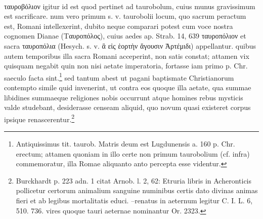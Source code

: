 \documentclass[a4paper, 11pt, oneside, polutonikogreek, german]{article}
\begin{document}
\paragraph{}
ταυροβόλιον igitur id est quod pertinet ad taurobolum, cuius munus gravissimum est sacrificare. num vero primum s. v. taurobolii locum, quo sacrum peractum est, Romani intellexerint, dubito neque comparari potest cum voce nostra cognomen Dianae (Ταυροπόλος), cuius aedes ap. Strab. 14, 639 ταυροπόλιον et sacra ταυροπόλια (Hesych. s. v. ἃ εἰς ἑορτὴν ἄγουσιν Ἀρτέμιδι) appellantur. quibus autem temporibus illa sacra Romani acceperint, non satis constat; attamen vix quisquam negabit quin non nisi aetate imperatoria, fortasse iam primo p. Chr. saeculo facta sint.\footnote{Antiquissimus tit. taurob. Matris deum est Lugdunensis a. 160 p. Chr. erectum; attamen quoniam in illo certe non primum taurobolium (cf. infra) commemoratur, illa Romae aliquanto anto percepta esse videntur.} sed tantum abest ut pagani baptismate Christianorum contempto simile quid invenerint, ut contra eos quoque illa aetate, qua summae libidines summaeque religiones nobis occurrunt atque homines rebus mysticis valde studebant, desiderasse censeam aliquid, quo novum quasi existeret corpus ipsique renascerentur.\footnote{Burckhardt p. 223 adn. 1 citat Arnob. l. 2, 62: Etruria libris in Acheronticis pollicetur certorum animalium sanguine numinibus certis dato divinas animas fieri et ab legibus mortalitatis educi. --renatus in aeternum legitur C. I. L. 6, 510. 736. vires quoque tauri aeternae nominantur Or. 2323.}
\end{document}

